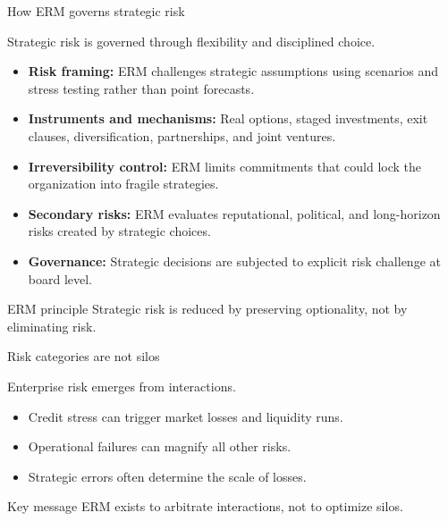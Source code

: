 \documentclass[aspectratio=169, 10pt]{beamer} %
\begin{document}
\begin{frame}{How ERM governs strategic risk}

Strategic risk is governed through flexibility and disciplined choice.

\medskip

\begin{itemize}
  \item[$\bullet$] \textbf{Risk framing:} ERM challenges strategic assumptions
  using scenarios and stress testing rather than point forecasts.

  \item[$\bullet$] \textbf{Instruments and mechanisms:} Real options, staged
  investments, exit clauses, diversification, partnerships, and joint ventures.

  \item[$\bullet$] \textbf{Irreversibility control:} ERM limits commitments that
  could lock the organization into fragile strategies.

  \item[$\bullet$] \textbf{Secondary risks:} ERM evaluates reputational,
  political, and long-horizon risks created by strategic choices.

  \item[$\bullet$] \textbf{Governance:} Strategic decisions are subjected to
  explicit risk challenge at board level.
\end{itemize}

\begin{block}{ERM principle}
Strategic risk is reduced by preserving optionality, not by eliminating risk.
\end{block}

\end{frame}


\begin{frame}{Risk categories are not silos}

Enterprise risk emerges from interactions.

\medskip

\begin{itemize}
  \item[$\bullet$] Credit stress can trigger market losses and liquidity runs.

  \item[$\bullet$] Operational failures can magnify all other risks.

  \item[$\bullet$] Strategic errors often determine the scale of losses.
\end{itemize}

\begin{block}{Key message}
ERM exists to arbitrate interactions, not to optimize silos.
\end{block}

\end{frame}
\end{document}
